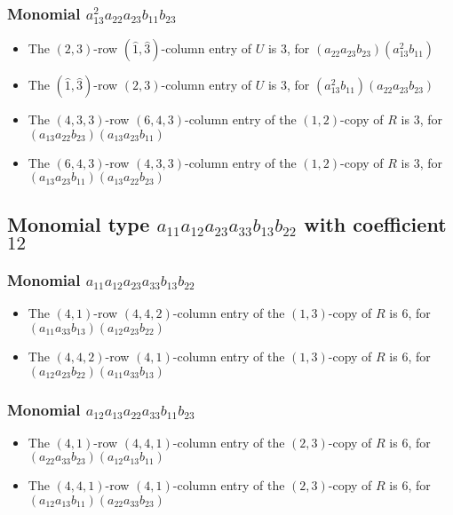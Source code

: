 \documentclass{article}
\begin{document}
\subsubsection{Monomial $ a_{13}^{2} a_{22} a_{23} b_{11} b_{23} $}

\begin{itemize}
\item The $ \left(2, 3\right) $-row $ (\hat{1}, \hat{3}) $-column entry of $U$ is $ 3 $, for $( a_{22} a_{23} b_{23} )( a_{13}^{2} b_{11} )$ 
\item The $(\hat{1}, \hat{3})$-row $ \left(2, 3\right) $-column entry of $U$ is $ 3 $, for $( a_{13}^{2} b_{11} )( a_{22} a_{23} b_{23} )$ 
\item The $(4, 3, 3)$-row $(6, 4, 3)$-column entry of the $ \left(1, 2\right) $-copy of $R$ is $ 3 $, for $( a_{13} a_{22} b_{23} )( a_{13} a_{23} b_{11} )$ 
\item The $(6, 4, 3)$-row $(4, 3, 3)$-column entry of the $ \left(1, 2\right) $-copy of $R$ is $ 3 $, for $( a_{13} a_{23} b_{11} )( a_{13} a_{22} b_{23} )$ 
\end{itemize}
\subsection{Monomial type $ a_{11} a_{12} a_{23} a_{33} b_{13} b_{22} $ with coefficient $ 12 $}

\subsubsection{Monomial $ a_{11} a_{12} a_{23} a_{33} b_{13} b_{22} $}

\begin{itemize}
\item The $(4, 1)$-row $(4, 4, 2)$-column entry of the $ \left(1, 3\right) $-copy of $R$ is $ 6 $, for $( a_{11} a_{33} b_{13} )( a_{12} a_{23} b_{22} )$ 
\item The $(4, 4, 2)$-row $(4, 1)$-column entry of the $ \left(1, 3\right) $-copy of $R$ is $ 6 $, for $( a_{12} a_{23} b_{22} )( a_{11} a_{33} b_{13} )$ 
\end{itemize}
\subsubsection{Monomial $ a_{12} a_{13} a_{22} a_{33} b_{11} b_{23} $}

\begin{itemize}
\item The $(4, 1)$-row $(4, 4, 1)$-column entry of the $ \left(2, 3\right) $-copy of $R$ is $ 6 $, for $( a_{22} a_{33} b_{23} )( a_{12} a_{13} b_{11} )$ 
\item The $(4, 4, 1)$-row $(4, 1)$-column entry of the $ \left(2, 3\right) $-copy of $R$ is $ 6 $, for $( a_{12} a_{13} b_{11} )( a_{22} a_{33} b_{23} )$ 
\end{itemize}
\end{document}

